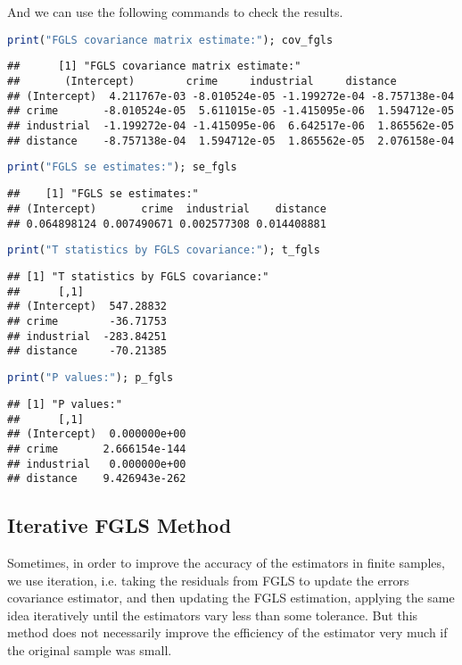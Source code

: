 \documentclass{article}
\theoremstyle{definition}
\begin{document}
And we can use the following commands to check the results.

\begin{lstlisting}[language = R]
print("FGLS covariance matrix estimate:"); cov_fgls
\end{lstlisting}

\begin{Verbatim}
## 		[1] "FGLS covariance matrix estimate:"
## 	     (Intercept)        crime     industrial     distance
## (Intercept)  4.211767e-03 -8.010524e-05 -1.199272e-04 -8.757138e-04
## crime       -8.010524e-05  5.611015e-05 -1.415095e-06  1.594712e-05
## industrial  -1.199272e-04 -1.415095e-06  6.642517e-06  1.865562e-05
## distance    -8.757138e-04  1.594712e-05  1.865562e-05  2.076158e-04
\end{Verbatim}

\begin{lstlisting}[language = R]
print("FGLS se estimates:"); se_fgls
\end{lstlisting}

\begin{Verbatim}
## 	  [1] "FGLS se estimates:"
## (Intercept)       crime  industrial    distance 
## 0.064898124 0.007490671 0.002577308 0.014408881 
\end{Verbatim}

\begin{lstlisting}[language = R]
print("T statistics by FGLS covariance:"); t_fgls
\end{lstlisting}

\begin{Verbatim}
## [1] "T statistics by FGLS covariance:"
## 		[,1]
## (Intercept)  547.28832
## crime        -36.71753
## industrial  -283.84251
## distance     -70.21385
\end{Verbatim}

\begin{lstlisting}[language = R]
print("P values:"); p_fgls
\end{lstlisting}

\begin{Verbatim}
## [1] "P values:"
##		[,1]
## (Intercept)  0.000000e+00
## crime       2.666154e-144
## industrial   0.000000e+00
## distance    9.426943e-262
\end{Verbatim}


\subsection{Iterative FGLS Method}
Sometimes, in order to improve the accuracy of the estimators in finite samples, we use iteration, i.e. taking the residuals from FGLS to update the errors covariance estimator, and then updating the FGLS estimation, applying the same idea iteratively until the estimators vary less than some tolerance. But this method does not necessarily improve the efficiency of the estimator very much if the original sample was small.\\
\end{document}
